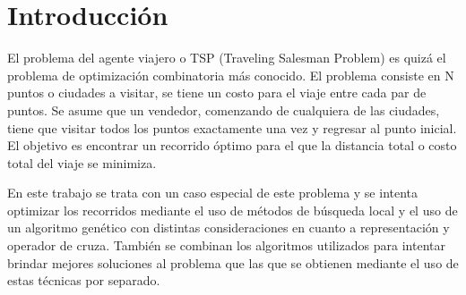 \section*{Introducción}
El problema del agente viajero o TSP (Traveling Salesman Problem) es quizá el problema de optimización combinatoria más conocido. El problema consiste en N puntos o ciudades a visitar, se tiene un costo para el viaje entre cada par de puntos. Se asume que un vendedor, comenzando de cualquiera de las ciudades, tiene que visitar todos los puntos exactamente una vez y regresar al punto inicial. El objetivo es encontrar un recorrido óptimo para el que la distancia total o costo total del viaje se minimiza.
\par En este trabajo se trata con un caso especial de este problema y se intenta optimizar los recorridos mediante el uso de métodos de búsqueda local y el uso de un algoritmo genético con distintas consideraciones en cuanto a representación y operador de cruza. También se combinan los algoritmos utilizados para intentar brindar mejores soluciones al problema que las que se obtienen mediante el uso de estas técnicas por separado.
